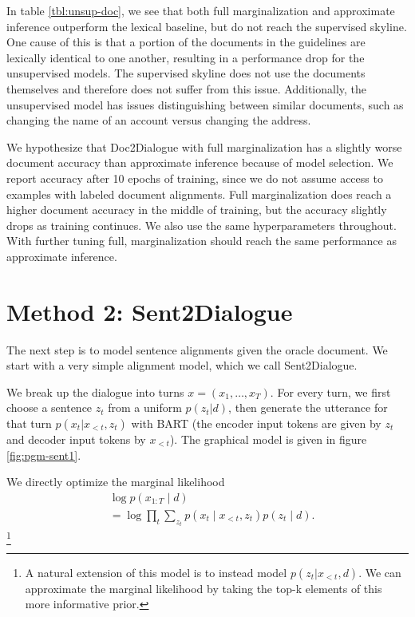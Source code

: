 \documentclass[11pt]{article}
\begin{document}
In table \ref{tbl:unsup-doc}, we see that both full marginalization and approximate inference
outperform the lexical baseline, but do not reach the supervised skyline.
One cause of this is that a portion of the documents in the guidelines are lexically identical to one
another, resulting in a performance drop for the unsupervised models.
The supervised skyline does not use the documents themselves and therefore does not
suffer from this issue.
Additionally, the unsupervised model has issues distinguishing between similar
documents, such as changing the name of an account versus changing the address.

We hypothesize that Doc2Dialogue with full marginalization has a slightly worse document accuracy
than approximate inference because of model selection.
We report accuracy after 10 epochs of training, since we do not assume access to
examples with labeled document alignments.
Full marginalization does reach a higher document accuracy in the middle of training,
but the accuracy slightly drops as training continues.
We also use the same hyperparameters throughout.
With further tuning full, marginalization should reach the same performance as
approximate inference.

\section{Method 2: Sent2Dialogue}
The next step is to model sentence alignments given the oracle document.
We start with a very simple alignment model, which we call Sent2Dialogue.

We break up the dialogue into turns $x = (x_1,\ldots,x_T)$.
For every turn, we first choose a sentence $z_t$ from a uniform $p(z_t|d)$,
then generate the utterance for that turn $p(x_t|x_{<t}, z_t)$ with BART
(the encoder input tokens are given by $z_t$ and decoder input tokens by $x_{<t}$).
The graphical model is given in figure \ref{fig:pgm-sent1}.

We directly optimize the marginal likelihood
\begin{equation}
\begin{aligned}
&\log p(x_{1:T}\mid d)\\
&= \log \prod_t \sum_{z_t} p(x_t \mid x_{<t}, z_t) p(z_t\mid d).
\end{aligned}
\end{equation}
\footnote{A natural extension of this model is to instead model $p(z_t|x_{<t},d)$.
We can approximate the marginal likelihood by taking the top-k elements of this
more informative prior.}
\end{document}
